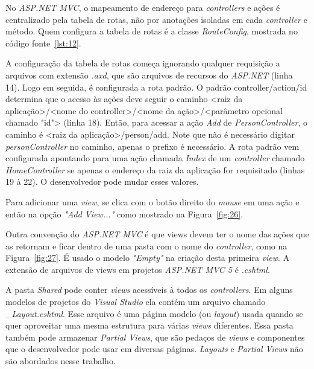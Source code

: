 \newpage


No \textit{ASP.NET MVC}, o mapeamento de endereço para \textit{controllers} e ações é centralizado pela tabela de rotas, não por anotações isoladas em cada \textit{controller} e método. Quem configura a tabela de rotas é a classe \textit{RouteConfig}, mostrada no código fonte~\ref{lst:12}.


A configuração da tabela de rotas começa ignorando qualquer requisição a arquivos com extensão \textit{.axd}, que são arquivos de recursos do \textit{ASP.NET} (linha 14). Logo em seguida, é configurada a rota padrão. O padrão {controller}/{action}/{id} determina que o acesso às ações deve seguir o caminho <raiz da aplicação>/<nome do controller>/<nome da ação>/<parâmetro opcional chamado "id"> (linha 18). Então, para acessar a ação \textit{Add} de \textit{PersonController}, o caminho é <raiz da aplicação>/person/add. Note que não é necessário digitar \textit{personController} no caminho, apenas o prefixo é necessário. A rota padrão vem configurada apontando para uma ação chamada \textit{Index} de um \textit{controller} chamado \textit{HomeController} se apenas o endereço da raiz da aplicação for requisitado (linhas 19 à 22). O desenvolvedor pode mudar esses valores. 

Para adicionar uma \textit{view}, se clica com o botão direito do \textit{mouse} em uma ação e então na opção \textit{"Add View..."} como mostrado na Figura~\ref{fig:26}. 


Outra convenção do \textit{ASP.NET MVC} é que views devem ter o nome das ações que as retornam e ficar dentro de uma pasta com o nome do \textit{controller}, como na Figura~\ref{fig:27}. É usado o modelo \textit{"Empty"} na criação desta primeira \textit{view}. A extensão de arquivos de views em projetos \textit{ASP.NET MVC 5} é \textit{.cshtml}.


A pasta \textit{Shared} pode conter \textit{views} acessíveis à todos os \textit{controllers}. Em alguns modelos de projetos do \textit{Visual Studio} ela contém um arquivo chamado \textit{\_Layout.cshtml}. Esse arquivo é uma página modelo (ou \textit{layout}) usada quando se quer aproveitar uma mesma estrutura para várias \textit{views} diferentes. Essa pasta também pode armazenar \textit{Partial Views}, que são pedaços de \textit{views} e componentes que o desenvolvedor pode usar em diversas páginas. \textit{Layouts} e \textit{Partial Views} não são abordados nesse trabalho.

